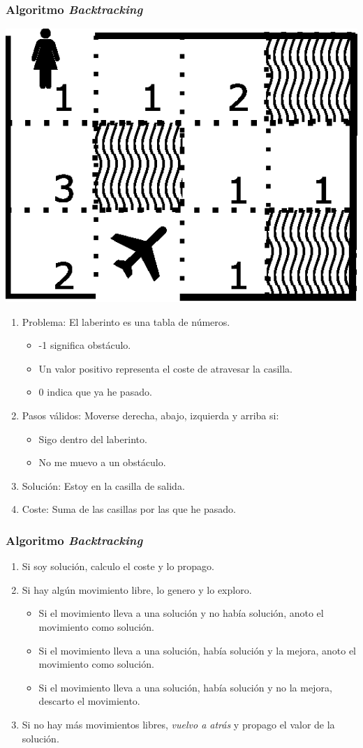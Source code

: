 \documentclass[a4paper,t,xcolor=pst,dvips,colortheme]{beamer}
\begin{document}
\begin{frame}[c]
    \frametitle{Algoritmo \emph{Backtracking}}
    \begin{center}
        \includegraphics[width=0.25\linewidth]{images/backtracking/laberinto.eps}
    \end{center}
    \begin{enumerate}[<+->]
        \item Problema: El laberinto es una tabla de números.
            \begin{itemize}
                \item -1 significa obstáculo.
                \item Un valor positivo representa el coste de atravesar la casilla.
                \item 0 indica que ya he pasado.
            \end{itemize}
        \item Pasos válidos: Moverse derecha, abajo, izquierda y arriba si:
            \begin{itemize}
                \item Sigo dentro del laberinto.
                \item No me muevo a un obstáculo.
            \end{itemize}
        \item Solución: Estoy en la casilla de salida.
        \item Coste: Suma de las casillas por las que he pasado.
    \end{enumerate}
\end{frame}

\begin{frame}[c]
    \frametitle{Algoritmo \emph{Backtracking}}
    \begin{enumerate}[<+->]
        \item Si soy solución, calculo el coste y lo propago.
        \item Si hay algún movimiento libre, lo genero y lo exploro.
        \begin{itemize}
            \item Si el movimiento lleva a una solución y no había solución, anoto el movimiento como solución.
            \item Si el movimiento lleva a una solución, había solución y la mejora, anoto el movimiento como solución.
            \item Si el movimiento lleva a una solución, había solución y no la mejora, descarto el movimiento.
        \end{itemize}
        \item Si no hay más movimientos libres, \emph{vuelvo a atrás} y propago el valor de la solución.
    \end{enumerate}
\end{frame}
\end{document}
